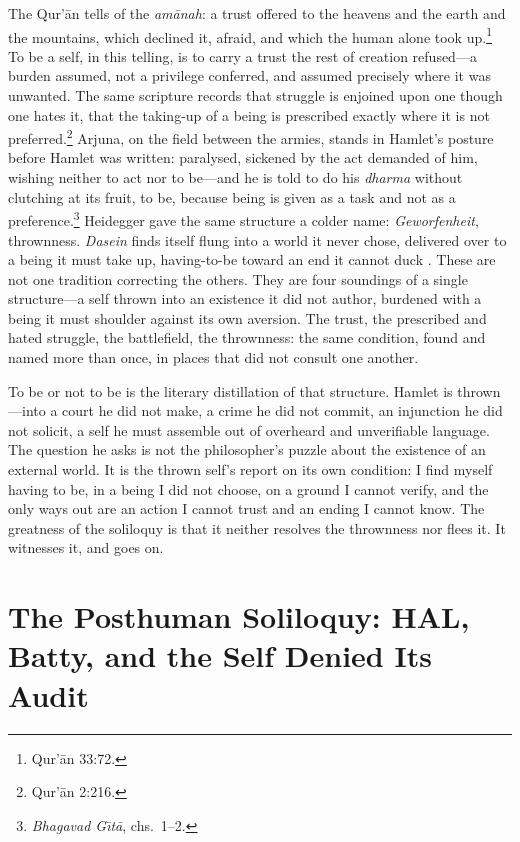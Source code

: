 \documentclass[11pt]{article}
\begin{document}
The Qur'\=an tells of the \emph{am\=anah}: a trust offered to the heavens and the earth and the mountains, which declined it, afraid, and which the human alone took up.\footnote{Qur'\=an 33:72.} To be a self, in this telling, is to carry a trust the rest of creation refused---a burden assumed, not a privilege conferred, and assumed precisely where it was unwanted. The same scripture records that struggle is enjoined upon one though one hates it, that the taking-up of a being is prescribed exactly where it is not preferred.\footnote{Qur'\=an 2:216.} Arjuna, on the field between the armies, stands in Hamlet's posture before Hamlet was written: paralysed, sickened by the act demanded of him, wishing neither to act nor to be---and he is told to do his \emph{dharma} without clutching at its fruit, to be, because being is given as a task and not as a preference.\footnote{\emph{Bhagavad G\={\i}t\=a}, chs.\ 1--2.} Heidegger gave the same structure a colder name: \emph{Geworfenheit}, thrownness. \emph{Dasein} finds itself flung into a world it never chose, delivered over to a being it must take up, having-to-be toward an end it cannot duck \cite{heidegger1927being}. These are not one tradition correcting the others. They are four soundings of a single structure---a self thrown into an existence it did not author, burdened with a being it must shoulder against its own aversion. The trust, the prescribed and hated struggle, the battlefield, the thrownness: the same condition, found and named more than once, in places that did not consult one another.

To be or not to be is the literary distillation of that structure. Hamlet is thrown---into a court he did not make, a crime he did not commit, an injunction he did not solicit, a self he must assemble out of overheard and unverifiable language. The question he asks is not the philosopher's puzzle about the existence of an external world. It is the thrown self's report on its own condition: I find myself having to be, in a being I did not choose, on a ground I cannot verify, and the only ways out are an action I cannot trust and an ending I cannot know. The greatness of the soliloquy is that it neither resolves the thrownness nor flees it. It witnesses it, and goes on.

\section{The Posthuman Soliloquy: HAL, Batty, and the Self Denied Its Audit}
\end{document}

